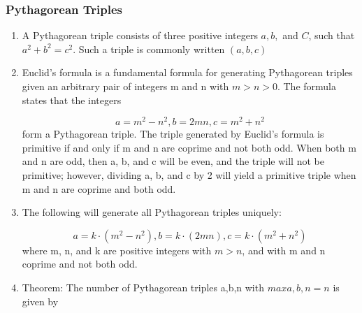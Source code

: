 \subsubsection{Pythagorean Triples}\begin{enumerate}

            
            \item A Pythagorean triple consists of three positive integers $\displaystyle a, b,$ and $\displaystyle C$,
                such
                that
                $\displaystyle a^{2}+b^{2}=c^{2}$. Such a triple is commonly written $\displaystyle (a, b, c)$
            \item 
                Euclid’s formula is a fundamental formula for generating Pythagorean triples given an arbitrary pair
                    of
                    integers m and n with $m >n >0$. The formula states that the integers

                \[\displaystyle a = m^{2}-n^{2}, b = 2mn, c = m^{2}+n^{2}\]
                form a Pythagorean triple. The triple generated by Euclid’s formula is primitive if and only if m and
                    n
                    are
                    coprime and not both odd. When both m and n are odd, then a, b, and c will be even, and the triple
                    will
                    not
                    be primitive; however, dividing a, b, and c by 2 will yield a primitive triple when m and n are
                    coprime
                    and
                    both odd.

            
            \item 
                The following will generate all Pythagorean triples uniquely:

                \[\displaystyle a = k\cdot \left( m^{2}-n^{2}\right), b = k\cdot\left(2mn\right), c = k\cdot
                \left(m^{2}+n^{2}\right)\]
                where m, n, and k are positive integers with $m > n$, and with m and n coprime and not both odd.
                

            
            \item 
                Theorem:
                    The number of Pythagorean triples
                    {a,b,n} with $max{a,b,n} = n$ is given by


\end{enumerate}
